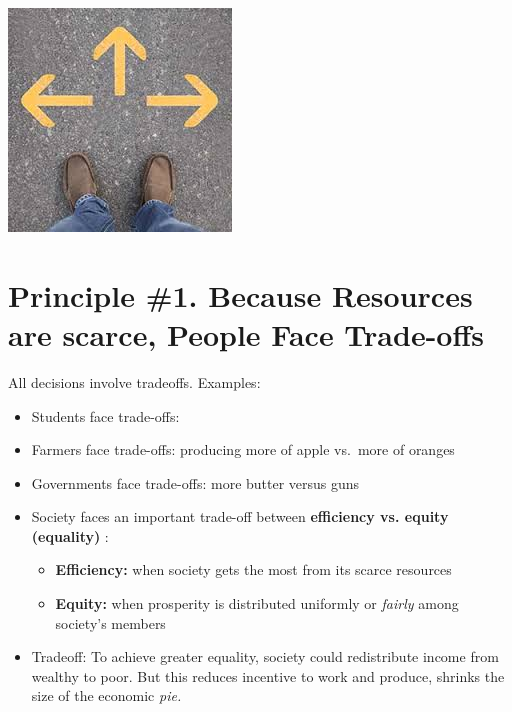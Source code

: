 \documentclass[
]{book}
\begin{document}
\includegraphics[width=\textwidth,height=0.6\textheight]{images/lesson01/fig1a.JPG}

\hypertarget{principle-1.-because-resources-are-scarce-people-face-trade-offs}{%
\section{Principle \#1. Because Resources are scarce, People Face Trade-offs}\label{principle-1.-because-resources-are-scarce-people-face-trade-offs}}

All decisions involve tradeoffs. Examples:

\begin{itemize}
\item
  Students face trade-offs:
\item
  Farmers face trade-offs: producing more of apple vs.~more of oranges
\item
  Governments face trade-offs: more butter versus guns
\item
  Society faces an important trade-off between \textbf{\color{blue} efficiency vs. equity (equality) }:

  \begin{itemize}
  \item
    \textbf{Efficiency:} when society gets the most from its scarce resources
  \item
    \textbf{Equity:} when prosperity is distributed uniformly or \emph{fairly} among society's members
  \end{itemize}
\item
  Tradeoff: To achieve greater equality, society could redistribute income from wealthy to poor. But this reduces incentive to work and produce, shrinks the size of the economic \emph{pie.}
\end{itemize}
\end{document}
